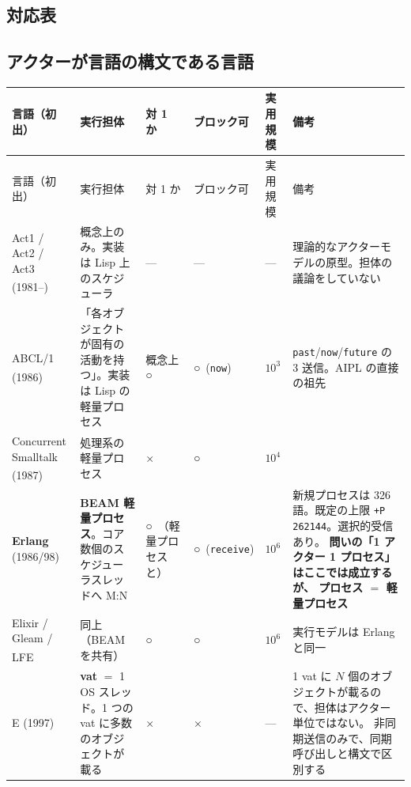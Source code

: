 \documentclass[11pt,a4paper]{ltjsarticle}
\newcommand{\dg}{\textsuperscript{\dag}}
\newcommand{\yes}{\textbf{○}}
\newcommand{\no}{×}
\begin{document}
\begin{landscape}
\section{対応表}
\label{sec:table}

\subsection{アクターが言語の構文である言語}

\begin{longtable}{@{}p{3.3cm}p{4.6cm}>{\raggedright\arraybackslash}p{2.5cm}>{\raggedright\arraybackslash}p{2.6cm}>{\raggedright\arraybackslash}p{1.5cm}p{6.0cm}@{}}
\toprule
言語（初出） & 実行担体 & 1 対 1 か & ブロック可 & 実用規模 & 備考 \\
\midrule
\endfirsthead
\toprule
言語（初出） & 実行担体 & 1 対 1 か & ブロック可 & 実用規模 & 備考 \\
\midrule
\endhead
\bottomrule
\endfoot

Act1 / Act2 / Act3 (1981--)\dg
  & 概念上のみ。実装は Lisp 上のスケジューラ
  & ---
  & ---
  & ---
  & 理論的なアクターモデルの原型。担体の議論をしていない \\

ABCL/1 (1986)\dg
  & 「各オブジェクトが固有の活動を持つ」。実装は Lisp の軽量プロセス
  & 概念上 \yes
  & \yes\ (\texttt{now})
  & $10^{3}$
  & \texttt{past}/\texttt{now}/\texttt{future} の 3 送信。AIPL の直接の祖先 \\

Concurrent Smalltalk (1987)\dg
  & 処理系の軽量プロセス
  & \no
  & \yes
  & $10^{4}$
  & \\

\textbf{Erlang} (1986/98)
  & \textbf{BEAM 軽量プロセス}。コア数個のスケジューラスレッドへ M:N
  & \yes\ （軽量プロセスと）
  & \yes\ (\texttt{receive})
  & $10^{6}$
  & 新規プロセスは 326 語。既定の上限 \texttt{+P 262144}。選択的受信あり。
    \textbf{問いの「1 アクター 1 プロセス」はここでは成立するが、
    プロセス $=$ 軽量プロセス} \\

Elixir / Gleam / LFE\dg
  & 同上（BEAM を共有）
  & \yes
  & \yes
  & $10^{6}$
  & 実行モデルは Erlang と同一 \\

E (1997)
  & \textbf{vat} $=$ 1 OS スレッド。1 つの vat に多数のオブジェクトが載る
  & \no
  & \no
  & ---
  & 1 vat に $N$ 個のオブジェクトが載るので、担体はアクター単位ではない。
    非同期送信のみで、同期呼び出しと構文で区別する \\


\end{longtable}
\end{landscape}
\end{document}
